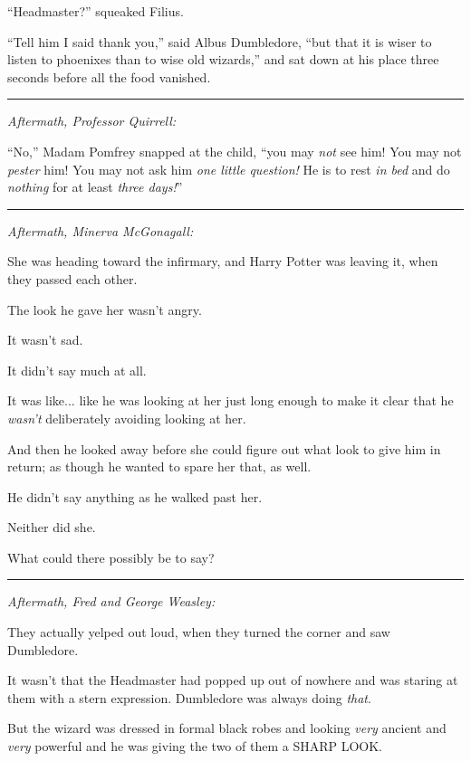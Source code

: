 ``Headmaster?'' squeaked Filius.

``Tell him I said thank you,'' said Albus Dumbledore, ``but that it is wiser to listen to phoenixes than to wise old wizards,'' and sat down at his place three seconds before all the food vanished.

\begin{center}\rule{3in}{0.4pt}\end{center}

\emph{Aftermath, Professor Quirrell:}

``No,'' Madam Pomfrey snapped at the child, ``you may \emph{not} see him! You may not \emph{pester} him! You may not ask him \emph{one little question!} He is to rest \emph{in bed} and do \emph{nothing} for at least \emph{three days!}''

\begin{center}\rule{3in}{0.4pt}\end{center}

\emph{Aftermath, Minerva McGonagall:}

She was heading toward the infirmary, and Harry Potter was leaving it, when they passed each other.

The look he gave her wasn't angry.

It wasn't sad.

It didn't say much at all.

It was like... like he was looking at her just long enough to make it clear that he \emph{wasn't} deliberately avoiding looking at her.

And then he looked away before she could figure out what look to give him in return; as though he wanted to spare her that, as well.

He didn't say anything as he walked past her.

Neither did she.

What could there possibly be to say?

\begin{center}\rule{3in}{0.4pt}\end{center}

\emph{Aftermath, Fred and George Weasley:}

They actually yelped out loud, when they turned the corner and saw Dumbledore.

It wasn't that the Headmaster had popped up out of nowhere and was staring at them with a stern expression. Dumbledore was always doing \emph{that}.

But the wizard was dressed in formal black robes and looking \emph{very} ancient and \emph{very} powerful and he was giving the two of them a SHARP LOOK.

